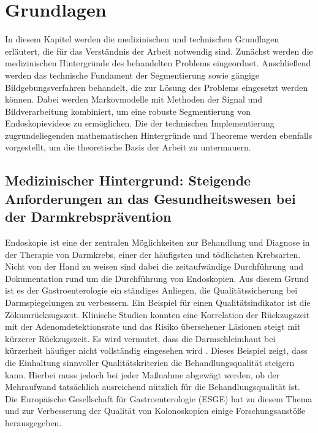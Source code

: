 \chapter{Grundlagen}\label{ch:preliminaries}

In diesem Kapitel werden die medizinischen und technischen Grundlagen erläutert, die für das Verständnis der Arbeit notwendig sind.
Zunächst werden die medizinischen Hintergründe des behandelten Problems eingeordnet.
Anschließend werden das technische Fundament der Segmentierung sowie gängige Bildgebungsverfahren behandelt, die zur Lösung des Problems eingesetzt werden können.
Dabei werden Markovmodelle mit Methoden der Signal und Bildverarbeitung kombiniert, um eine robuste Segmentierung von Endoskopievideos zu ermöglichen.
Die der technischen Implementierung zugrundeliegenden mathematischen Hintergründe und Theoreme werden ebenfalls vorgestellt, um die theoretische Basis der Arbeit zu untermauern.

\section{Medizinischer Hintergrund: Steigende Anforderungen an das Gesundheitswesen bei der Darmkrebsprävention}
Endoskopie ist eine der zentralen Möglichkeiten zur Behandlung und Diagnose in der Therapie von Darmkrebs, einer der häufigsten und tödlichsten Krebsarten. \cite{labianca2010-colon-cancer}
Nicht von der Hand zu weisen sind dabei die zeitaufwändige Durchführung und Dokumentation rund um die Durchführung von Endoskopien. Aus diesem Grund ist es der Gastroenterologie ein ständiges Anliegen, die Qualitätssicherung bei Darmspiegelungen zu verbessern.
Ein Beispiel für einen Qualitätsindikator ist die Zökumrückzugszeit. Klinische Studien konnten eine Korrelation der Rückzugszeit mit der Adenomdetektionsrate und das Risiko übersehener Läsionen steigt mit kürzerer Rückzugszeit. Es wird vermutet, dass die Darmschleimhaut bei kürzerheit häufiger nicht vollständig eingesehen wird \cite{vilmann-2022}. 
Dieses Beispiel zeigt, dass die Einhaltung sinnvoller Qualitätskriterien die Behandlungsqualität steigern kann. Hierbei muss jedoch bei jeder Maßnahme abgewägt werden, ob der Mehraufwand tatsächlich ausreichend nützlich für die Behandlungsqualität ist. Die Europäische Gesellschaft für Gastroenterologie (ESGE) hat zu diesem Thema und zur Verbesserung der Qualität von Kolonoskopien einige Forschungsanstöße herausgegeben.

